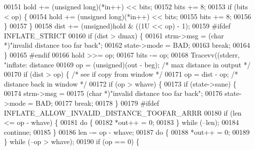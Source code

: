 \begin{DoxyCode}
{{{{00151                     hold += (\textcolor{keywordtype}{unsigned} long)(*in++) << bits;
00152                     bits += 8;
00153                     \textcolor{keywordflow}{if} (bits < op) \{
00154                         hold += (\textcolor{keywordtype}{unsigned} long)(*in++) << bits;
00155                         bits += 8;
00156                     \}
00157                 \}
00158                 dist += (unsigned)hold & ((1U << op) - 1);
00159 \textcolor{preprocessor}{#ifdef INFLATE\_STRICT}
00160                 \textcolor{keywordflow}{if} (dist > dmax) \{
00161                     strm->msg = (\textcolor{keywordtype}{char} *)\textcolor{stringliteral}{"invalid distance too far back"};
00162                     state->mode = BAD;
00163                     \textcolor{keywordflow}{break};
00164                 \}
00165 \textcolor{preprocessor}{#endif}
00166                 hold >>= op;
00167                 bits -= op;
00168                 Tracevv((stderr, \textcolor{stringliteral}{"inflate:         distance %
00169                 op = (unsigned)(out - beg);     \textcolor{comment}{/* max distance in output */}
00170                 \textcolor{keywordflow}{if} (dist > op) \{                \textcolor{comment}{/* see if copy from window */}
00171                     op = dist - op;             \textcolor{comment}{/* distance back in window */}
00172                     \textcolor{keywordflow}{if} (op > whave) \{
00173                         \textcolor{keywordflow}{if} (state->sane) \{
00174                             strm->msg =
00175                                 (\textcolor{keywordtype}{char} *)\textcolor{stringliteral}{"invalid distance too far back"};
00176                             state->mode = BAD;
00177                             \textcolor{keywordflow}{break};
00178                         \}
00179 \textcolor{preprocessor}{#ifdef INFLATE\_ALLOW\_INVALID\_DISTANCE\_TOOFAR\_ARRR}
00180                         \textcolor{keywordflow}{if} (len <= op - whave) \{
00181                             \textcolor{keywordflow}{do} \{
00182                                 *out++ = 0;
00183                             \} \textcolor{keywordflow}{while} (--len);
00184                             \textcolor{keywordflow}{continue};
00185                         \}
00186                         len -= op - whave;
00187                         \textcolor{keywordflow}{do} \{
00188                             *out++ = 0;
00189                         \} \textcolor{keywordflow}{while} (--op > whave);
00190                         \textcolor{keywordflow}{if} (op == 0) \{
}}}}}
\end{DoxyCode}
